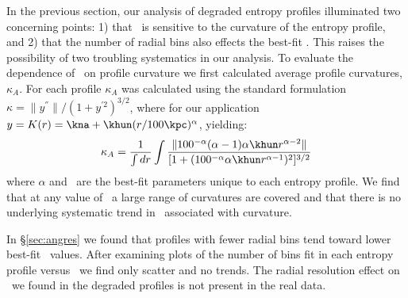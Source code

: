 \documentclass{emulateapj}
\begin{document}
In the previous section, our analysis of degraded entropy profiles
illuminated two concerning points: 1) that \kna\ is sensitive to the
curvature of the entropy profile, and 2) that the number of radial
bins also effects the best-fit \kna. This raises the possibility of
two troubling systematics in our analysis. To evaluate the dependence
of \kna\ on profile curvature we first calculated average profile
curvatures, $\kappa_A$. For each profile $\kappa_A$ was calculated
using the standard formulation $\kappa =
\|y^{''}\|/(1+y^{'2})^{3/2}$, where for our application $y = K(r) =
\kna+\khun(r/100\kpc)^{\alpha}$, yielding:
\begin{equation}
\kappa_A = \frac{1}{\int dr}\int\frac{\| 100^{-\alpha} (\alpha-1) \alpha \khun
  r^{\alpha-2}\|}{[1+(100^{-\alpha} \alpha \khun
  r^{\alpha-1})^2]^{3/2}}
\end{equation}
where $\alpha$ and \khun\ are the best-fit parameters unique to each
entropy profile. We find that at any value of \kna\ a large range of
curvatures are covered and that there is no underlying systematic
trend in \kna\ associated with curvature.


In \S\ref{sec:angres} we found that profiles with fewer radial bins
tend toward lower best-fit \kna\ values. After examining plots of the
number of bins fit in each entropy profile versus \kna\ we find only
scatter and no trends. The radial resolution effect on \kna\ we found
in the degraded profiles is not present in the real data.
\end{document}
